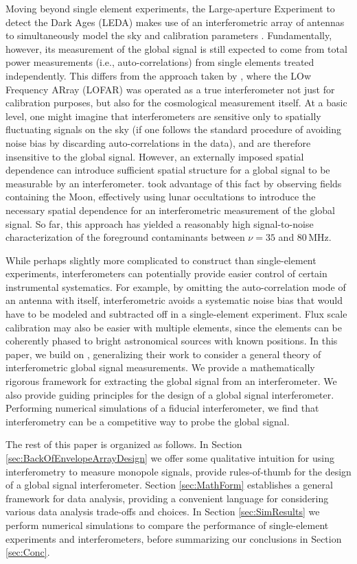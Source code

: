 \documentclass[twocolumn,apj,numberedappendix]{emulateapj}
\begin{document}
Moving beyond single element experiments, the Large-aperture Experiment to detect the Dark Ages (LEDA) makes use of an interferometric array of antennas to simultaneously model the sky and calibration parameters \citep{BernardiLEDA}.  Fundamentally, however, its measurement of the global signal is still expected to come from total power measurements (i.e., auto-correlations) from single elements treated independently.  This differs from the approach taken by \citet{VedanthamLOFAR2}, where the LOw Frequency ARray (LOFAR) was operated as a true interferometer not just for calibration purposes, but also for the cosmological measurement itself.  At a basic level, one might imagine that interferometers are sensitive only to spatially fluctuating signals on the sky (if one follows the standard procedure of avoiding noise bias by discarding auto-correlations in the data), and are therefore insensitive to the global signal.  However, an externally imposed spatial dependence can introduce sufficient spatial structure for a global signal to be measurable by an interferometer.  \citet{VedanthamLOFAR2} took advantage of this fact by observing fields containing the Moon, effectively using lunar occultations to introduce the necessary spatial dependence for an interferometric measurement of the global signal.  So far, this approach has yielded a reasonably high signal-to-noise characterization of the foreground contaminants between $\nu =35$ and $80\,\textrm{MHz}$.

While perhaps slightly more complicated to construct than single-element experiments, interferometers can potentially provide easier control of certain instrumental systematics. For example, by omitting the auto-correlation mode of an antenna with itself, interferometric avoids a systematic noise bias that would have to be modeled and subtracted off in a single-element experiment. Flux scale calibration may also be easier with multiple elements, since the elements can be coherently phased to bright astronomical sources with known positions. In this paper, we build on \citet{VedanthamLOFAR2}, generalizing their work to consider a general theory of interferometric global signal measurements.  We provide a mathematically rigorous framework for extracting the global signal from an interferometer. We also provide guiding principles for the design of a global signal interferometer. Performing numerical simulations of a fiducial interferometer, we find that interferometry can be a competitive way to probe the global signal.


The rest of this paper is organized as follows.  In Section \ref{sec:BackOfEnvelopeArrayDesign} we offer some qualitative intuition for using interferometry to measure monopole signals, provide rules-of-thumb for the design of a global signal interferometer. Section \ref{sec:MathForm} establishes a general framework for data analysis, providing a convenient language for considering various data analysis trade-offs and choices. In Section \ref{sec:SimResults} we perform numerical simulations to compare the performance of single-element experiments and interferometers, before summarizing our conclusions in Section \ref{sec:Conc}.
\end{document}
